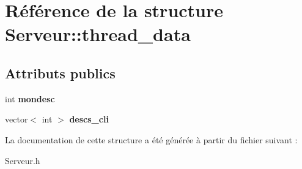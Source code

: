 \hypertarget{struct_serveur_1_1thread__data}{\section{Référence de la structure Serveur\-:\-:thread\-\_\-data}
\label{struct_serveur_1_1thread__data}
}
\subsection*{Attributs publics}
\begin{DoxyCompactItemize}
\item 
\hypertarget{struct_serveur_1_1thread__data_a95c4d2ea7693fd200e97515034d24d43}{int {\bfseries mondesc}}\label{struct_serveur_1_1thread__data_a95c4d2ea7693fd200e97515034d24d43}

\item 
\hypertarget{struct_serveur_1_1thread__data_a3a44b675cc9e6cb69a875ce58103f31f}{vector$<$ int $>$ {\bfseries descs\-\_\-cli}}\label{struct_serveur_1_1thread__data_a3a44b675cc9e6cb69a875ce58103f31f}

\end{DoxyCompactItemize}


La documentation de cette structure a été générée à partir du fichier suivant \-:\begin{DoxyCompactItemize}
\item 
Serveur.\-h\end{DoxyCompactItemize}

